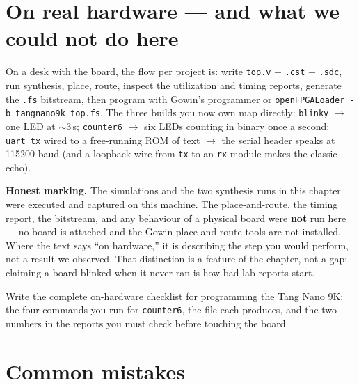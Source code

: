 \section{On real hardware --- and what we could not do here}
\label{sec:hardware}

On a desk with the board, the flow per project is: write
\texttt{top.v} + \texttt{.cst} + \texttt{.sdc}, run synthesis, place, route,
inspect the utilization and timing reports, generate the \texttt{.fs}
bitstream, then program with Gowin's programmer or
\texttt{openFPGALoader -b tangnano9k top.fs}. The three builds you now own map
directly: \texttt{blinky} $\to$ one LED at $\sim$3\,s; \texttt{counter6} $\to$
six LEDs counting in binary once a second; \texttt{uart\_tx} wired to a
free-running ROM of text $\to$ the serial header speaks at 115200 baud (and a
loopback wire from \texttt{tx} to an \texttt{rx} module makes the classic
echo).

\textbf{Honest marking.} The simulations and the two synthesis runs in this
chapter were executed and captured on this machine. The place-and-route, the
timing report, the bitstream, and any behaviour of a physical board were
\textbf{not} run here --- no board is attached and the Gowin place-and-route
tools are not installed. Where the text says ``on hardware,'' it is describing
the step you would perform, not a result we observed. That distinction is a
feature of the chapter, not a gap: claiming a board blinked when it never ran
is how bad lab reports start.

\begin{exercise}[hard]
Write the complete on-hardware checklist for programming the Tang Nano 9K:
the four commands you run for \texttt{counter6}, the file each produces,
and the two numbers in the reports you must check before touching the
board.
\end{exercise}

\section{Common mistakes}

